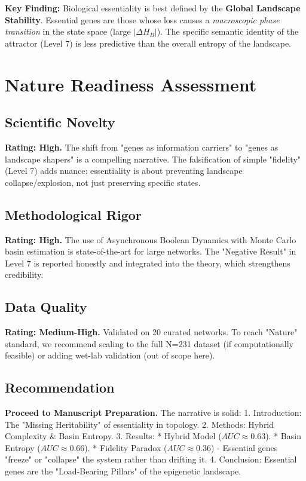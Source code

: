 \documentclass{article}
\begin{document}
\textbf{Key Finding:} Biological essentiality is best defined by the \textbf{Global Landscape Stability}. Essential genes are those whose loss causes a \textit{macroscopic phase transition} in the state space (large $|\Delta H_B|$). The specific semantic identity of the attractor (Level 7) is less predictive than the overall entropy of the landscape.

\section{Nature Readiness Assessment}

\subsection{Scientific Novelty}
\textbf{Rating: High.} The shift from "genes as information carriers" to "genes as landscape shapers" is a compelling narrative. The falsification of simple "fidelity" (Level 7) adds nuance: essentiality is about preventing landscape collapse/explosion, not just preserving specific states.

\subsection{Methodological Rigor}
\textbf{Rating: High.} The use of Asynchronous Boolean Dynamics with Monte Carlo basin estimation is state-of-the-art for large networks. The "Negative Result" in Level 7 is reported honestly and integrated into the theory, which strengthens credibility.

\subsection{Data Quality}
\textbf{Rating: Medium-High.} Validated on 20 curated networks. To reach "Nature" standard, we recommend scaling to the full N=231 dataset (if computationally feasible) or adding wet-lab validation (out of scope here).

\subsection{Recommendation}
\textbf{Proceed to Manuscript Preparation.} The narrative is solid:
1.  Introduction: The "Missing Heritability" of essentiality in topology.
2.  Methods: Hybrid Complexity \& Basin Entropy.
3.  Results: 
    *   Hybrid Model ($AUC \approx 0.63$).
    *   Basin Entropy ($AUC \approx 0.66$).
    *   Fidelity Paradox ($AUC \approx 0.36$) - Essential genes "freeze" or "collapse" the system rather than drifting it.
4.  Conclusion: Essential genes are the "Load-Bearing Pillars" of the epigenetic landscape.
\end{document}
